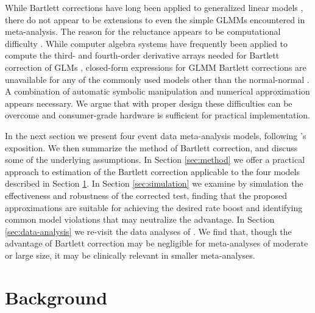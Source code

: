 \documentclass[12pt]{article}
\begin{document}
While Bartlett corrections have long been applied to generalized
linear models \citep{cordeiro:83}, there do not appear to be
extensions to even the simple GLMMs encountered in
meta-analysis. The reason for the reluctance appears to
be computational difficulty \citep{hanada:26}. While computer algebra
systems have frequently been applied to compute the third- and fourth-order
derivative arrays needed for Bartlett correction of GLMs
\citep{cordeiro:93,mccullagh:87,andrews:00}, closed-form expressions
for GLMM Bartlett corrections are unavailable for any of the commonly
used models other than the normal-normal
\citep{noma:11,michael:ma-bartlett}. A combination of automatic
symbolic manipulation and numerical approximation appears
necessary. %
We argue that with
proper design these difficulties can be overcome and consumer-grade
hardware is sufficient for practical implementation.

In the next section we present four event data meta-analysis models,
following \citet{stijnen:10}'s exposition. We then summarize the method of
Bartlett correction, and discuss some of the underlying
assumptions. In Section \ref{sec:method} we offer a practical approach
to estimation of the Bartlett correction applicable to the four
models described in Section \ref{sec:background}. In Section
\ref{sec:simulation} we examine by simulation the effectiveness and robustness of
the corrected test, finding that the proposed approximations are suitable for achieving the desired rate boost and identifying common model violations that may neutralize the advantage. In Section \ref{sec:data-analysis} we
re-visit the data analyses of \citet{stijnen:10}. We find that, though the
advantage of Bartlett correction may be  negligible for 
meta-analyses of moderate or large size, it may be clinically relevant in smaller meta-analyses.


\section{Background}
\label{sec:background}

\end{document}
